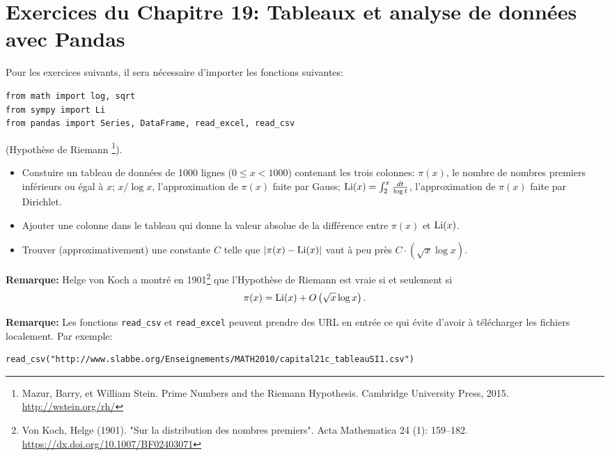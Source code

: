 \section*{Exercices du Chapitre 19: Tableaux et analyse de données avec Pandas}

Pour les exercices suivants, il sera nécessaire d'importer les fonctions
suivantes:
\begin{verbatim}
from math import log, sqrt
from sympy import Li
from pandas import Series, DataFrame, read_excel, read_csv
\end{verbatim}

\begin{exercice}
(Hypothèse de Riemann
\footnote{Mazur, Barry, et William Stein. Prime Numbers and the Riemann Hypothesis.
Cambridge University Press, 2015. \url{http://wstein.org/rh/}}).
\begin{itemize}
    \item Constuire un tableau de données de 1000 lignes ($0\leq
    x< 1000$) contenant les trois colonnes: 
    $\pi(x)$, le nombre de nombres premiers inférieurs ou égal à $x$;
    $x/\log x$, l'approximation de $\pi(x)$ faite par Gauss;
    ${\rm Li}(x)=\int_2^x \frac{dt}{\log t }$, l'approximation de $\pi(x)$
faite par Dirichlet.
    \item Ajouter une colonne dans le tableau qui donne la valeur absolue de la
différence entre $\pi(x)$ et ${\rm Li}(x)$. 
\end{itemize}
\begin{itemize}
\item Trouver (approximativement) une constante $C$ telle que
    $|\pi(x) - {\rm Li} (x)|$ vaut à peu près $C\cdot\left(\sqrt x \log x\right)$.
\end{itemize}
\noindent\textbf{Remarque:}
Helge von Koch a montré en
1901\footnote{
Von Koch, Helge (1901). "Sur la distribution des nombres premiers". Acta
Mathematica 24 (1): 159–182.
\url{https://dx.doi.org/10.1007/BF02403071}} que l'Hypothèse de Riemann 
est vraie si et seulement si 
\[
    \pi(x) = {\rm Li} (x) +  O\left(\sqrt x \log x\right). 
\]
\end{exercice}

\noindent\textbf{Remarque:}
Les fonctions \texttt{read\_csv} et \texttt{read\_excel} peuvent prendre des
URL en entrée ce qui évite d'avoir à télécharger les fichiers localement. 
Par exemple:
\begin{verbatim}
read_csv("http://www.slabbe.org/Enseignements/MATH2010/capital21c_tableauSI1.csv")
\end{verbatim}

